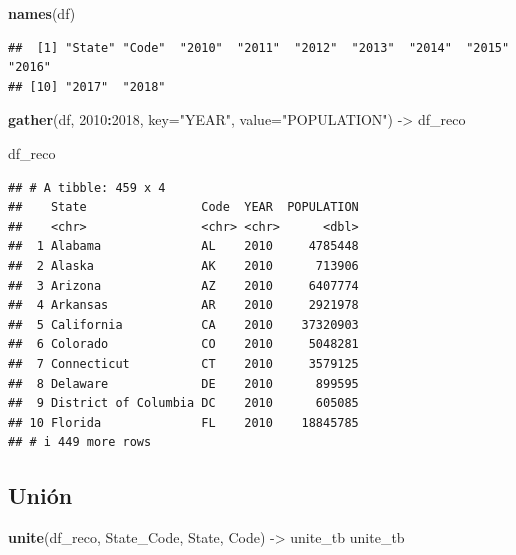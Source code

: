 \documentclass[
]{book}
\newenvironment{Shaded}{\begin{snugshade}}{\end{snugshade}}
\newcommand{\AttributeTok}[1]{\textcolor[rgb]{0.13,0.29,0.53}{#1}}
\newcommand{\FunctionTok}[1]{\textcolor[rgb]{0.13,0.29,0.53}{\textbf{#1}}}
\newcommand{\NormalTok}[1]{#1}
\newcommand{\OtherTok}[1]{\textcolor[rgb]{0.56,0.35,0.01}{#1}}
\newcommand{\SpecialCharTok}[1]{\textcolor[rgb]{0.81,0.36,0.00}{\textbf{#1}}}
\newcommand{\StringTok}[1]{\textcolor[rgb]{0.31,0.60,0.02}{#1}}
\begin{document}
\begin{Shaded}
\begin{Highlighting}[]
\FunctionTok{names}\NormalTok{(df)}
\end{Highlighting}
\end{Shaded}

\begin{verbatim}
##  [1] "State" "Code"  "2010"  "2011"  "2012"  "2013"  "2014"  "2015"  "2016" 
## [10] "2017"  "2018"
\end{verbatim}

\begin{Shaded}
\begin{Highlighting}[]
\FunctionTok{gather}\NormalTok{(df, }\StringTok{\textquotesingle{}2010\textquotesingle{}}\SpecialCharTok{:}\StringTok{\textquotesingle{}2018\textquotesingle{}}\NormalTok{,}
                 \AttributeTok{key=}\StringTok{"YEAR"}\NormalTok{,}
                 \AttributeTok{value=}\StringTok{"POPULATION"}\NormalTok{) }\OtherTok{{-}\textgreater{}}\NormalTok{ df\_reco}

\NormalTok{df\_reco}
\end{Highlighting}
\end{Shaded}

\begin{verbatim}
## # A tibble: 459 x 4
##    State                Code  YEAR  POPULATION
##    <chr>                <chr> <chr>      <dbl>
##  1 Alabama              AL    2010     4785448
##  2 Alaska               AK    2010      713906
##  3 Arizona              AZ    2010     6407774
##  4 Arkansas             AR    2010     2921978
##  5 California           CA    2010    37320903
##  6 Colorado             CO    2010     5048281
##  7 Connecticut          CT    2010     3579125
##  8 Delaware             DE    2010      899595
##  9 District of Columbia DC    2010      605085
## 10 Florida              FL    2010    18845785
## # i 449 more rows
\end{verbatim}

\subsection*{Unión}\label{uniuxf3n}

\begin{Shaded}
\begin{Highlighting}[]
\FunctionTok{unite}\NormalTok{(df\_reco, State\_Code, State, Code) }\OtherTok{{-}\textgreater{}}\NormalTok{ unite\_tb}
\NormalTok{unite\_tb}
\end{Highlighting}
\end{Shaded}
\end{document}

